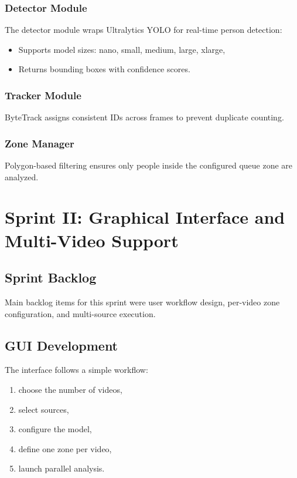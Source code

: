 \subsubsection{Detector Module}
The detector module wraps Ultralytics YOLO for real-time person detection:
\begin{itemize}
    \item Supports model sizes: nano, small, medium, large, xlarge,
    \item Returns bounding boxes with confidence scores.
\end{itemize}

\subsubsection{Tracker Module}
ByteTrack assigns consistent IDs across frames to prevent duplicate counting.

\subsubsection{Zone Manager}
Polygon-based filtering ensures only people inside the configured queue zone are analyzed.

\section{Sprint II: Graphical Interface and Multi-Video Support}

\subsection{Sprint Backlog}
Main backlog items for this sprint were user workflow design, per-video zone configuration, and multi-source execution.

\subsection{GUI Development}
The interface follows a simple workflow:
\begin{enumerate}
    \item choose the number of videos,
    \item select sources,
    \item configure the model,
    \item define one zone per video,
    \item launch parallel analysis.
\end{enumerate}

